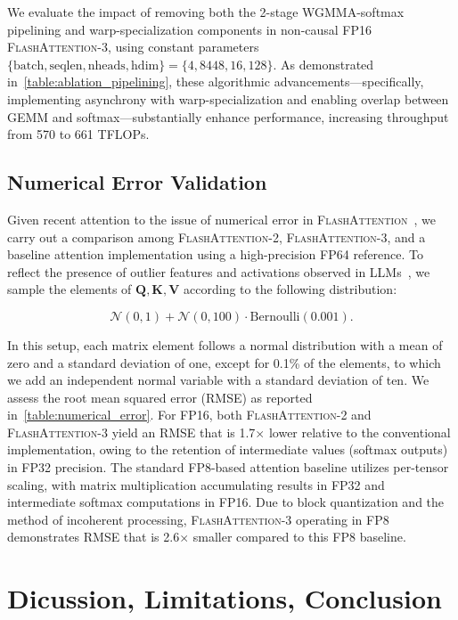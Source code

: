 \begin{enumerate}
\begin{enumerate}
\begin{itemize}
We evaluate the impact of removing both the 2-stage WGMMA-softmax pipelining and warp-specialization components in non-causal FP16 \textsc{FlashAttention-3}, using constant parameters $\{\text{batch}, \text{seqlen}, \text{nheads}, \text{hdim}\} = \{ 4, 8448, 16, 128\}$. As demonstrated in~\cref{table:ablation_pipelining}, these algorithmic advancements—specifically, implementing asynchrony with warp-specialization and enabling overlap between GEMM and softmax—substantially enhance performance, increasing throughput from 570 to 661 TFLOPs.

\subsection{Numerical Error Validation}
\label{sec:numerical_error}

Given recent attention to the issue of numerical error in \textsc{FlashAttention}~\citep{golden2024flash}, we carry out a comparison among \textsc{FlashAttention-2}, \textsc{FlashAttention-3}, and a baseline attention implementation using a high-precision FP64 reference. To reflect the presence of outlier features and activations observed in LLMs~\citep{dettmers2208llm, sun2024massive}, we sample the elements of $\mathbf{Q}, \mathbf{K}, \mathbf{V}$ according to the following distribution:

\begin{equation*}
  \mathcal{N}(0, 1) + \mathcal{N}(0, 100) \cdot \mathrm{Bernoulli}(0.001).
\end{equation*}

In this setup, each matrix element follows a normal distribution with a mean of zero and a standard deviation of one, except for 0.1\% of the elements, to which we add an independent normal variable with a standard deviation of ten. We assess the root mean squared error (RMSE) as reported in~\cref{table:numerical_error}. For FP16, both \textsc{FlashAttention-2} and \textsc{FlashAttention-3} yield an RMSE that is 1.7$\times$ lower relative to the conventional implementation, owing to the retention of intermediate values (softmax outputs) in FP32 precision. The standard FP8-based attention baseline utilizes per-tensor scaling, with matrix multiplication accumulating results in FP32 and intermediate softmax computations in FP16. Due to block quantization and the method of incoherent processing, \textsc{FlashAttention-3} operating in FP8 demonstrates RMSE that is 2.6$\times$ smaller compared to this FP8 baseline.

\section{Dicussion, Limitations, Conclusion}
\label{sec:discussion}


\end{itemize}
\end{enumerate}
\end{enumerate}
